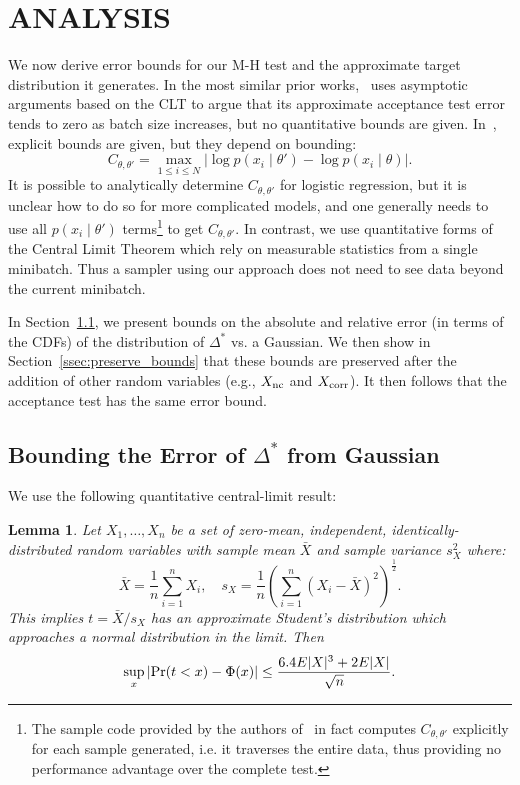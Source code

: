 \documentclass[twoside]{article} \usepackage{aistats2017}
\newtheorem{lemma}{Lemma}
\begin{document}
\section{ANALYSIS}\label{sec:analysis}

We now derive error bounds for our M-H test and the approximate target
distribution it generates. In the most similar prior
works,~\citet{cutting_mh_2014} uses asymptotic arguments based on the CLT to
argue that its approximate acceptance test error tends to zero as batch size
increases, but no quantitative bounds are given.
In~\citet{icml2014c1_bardenet14}, explicit bounds are given, but they depend on
bounding:
\begin{equation}\label{eq:bad_bound}
    C_{\theta, \theta'} = \max_{1\leq i\leq N}|\log p(x_i\mid\theta') - \log p(x_i\mid\theta)|.
\end{equation}
It is possible to analytically determine $C_{\theta,\theta'}$ for logistic
regression, but it is unclear how to do so for more complicated models, and one
generally needs to use all $p(x_i\mid \theta')$ terms\footnote{The sample code
provided by the authors of~\citet{icml2014c1_bardenet14} in fact computes
$C_{\theta,\theta'}$ explicitly for each sample generated, i.e. it traverses the
entire data, thus providing no performance advantage over the complete test.} to
get $C_{\theta,\theta'}$.  In contrast, we use quantitative forms of the Central
Limit Theorem which rely on measurable statistics from a single minibatch. Thus
a sampler using our approach does not need to see data beyond the current
minibatch.

In Section~\ref{ssec:delta_star_distribution}, we present bounds on the absolute
and relative error (in terms of the CDFs) of the distribution of $\Delta^*$ vs.
a Gaussian. We then show in Section~\ref{ssec:preserve_bounds} that these bounds
are preserved after the addition of other random variables (e.g., $X_{\rm nc}$
and $X_{\rm corr}$). It then follows that the acceptance test has the same error
bound.

\subsection{Bounding the Error of $\Delta^*$ from Gaussian}\label{ssec:delta_star_distribution}

We use the following quantitative central-limit result:
  
\begin{lemma}\label{lem:quant_clt}
Let $X_1,\ldots,X_n$ be a set of zero-mean, independent, identically-distributed
random variables with sample mean $\bar{X}$ and sample variance $s^2_X$
where:
\begin{equation}
    \bar{X} = \frac{1}{n}\sum_{i=1}^nX_i, \quad s_X = \frac{1}{n}\left(\sum_{i=1}^n(X_i-\bar{X})^2\right)^{\frac{1}{2}}.
\end{equation}
This implies $t=\bar{X}/s_X$ has an approximate Student's distribution
which approaches a normal distribution in the limit. Then
\begin{equation}\label{eq:clt-bounds}
    \sup_x|{\rm Pr}(t<x) - \Phi(x)| \leq \frac{6.4E|X|^3+2E|X|}{\sqrt{n}}.
\end{equation}
\end{lemma}
\end{document}
